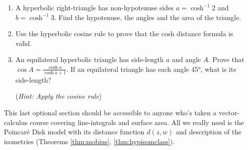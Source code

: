 \begin{exercises}
\begin{enumerate}
  
  \item A hyperbolic right-triangle has non-hypotenuse sides $a=\cosh^{-1}2$ and $b=\cosh^{-1}3$. Find the hypotenuse, the angles and the area of the triangle.
  
  
	\item Use the hyperbolic cosine rule to prove that the cosh distance formula is valid.
	
	\item An equilateral hyperbolic triangle has side-length $a$ and angle $A$. Prove that $\cos A=\frac{\cosh a}{\cosh a+1}$. If an equilateral triangle has each angle \ang{45}, what is its side-length?\par
	(\emph{Hint: Apply the cosine rule})
\end{enumerate}
\end{exercises}



\vfil\goodbreak






This last optional section should be accessible to anyone who's taken a vector-calculus course covering line-integrals and surface area. All we really need is the Poincaré Disk model with its distance function $d(z,w)$ and description of the isometries (Theorems \ref{thm:mobius}, \ref{thm:hypisomclass}).\smallbreak

